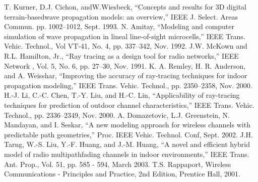 \documentclass[dvipdfmx]{jsarticle}
\begin{document}
\renewcommand{\refname}{文献一覧}
\begin{thebibliography}{99}
T. Kurner, D.J. Cichon, andW.Wiesbeck, “Concepts and results for 3D digital terrain-basedwave propagation models: an overview,” IEEE J. Select. Areas Commun. pp. 1002–1012, Sept. 1993.
N. Amitay, “Modeling and computer simulation of wave propagation in lineal line-of-sight microcells,” IEEE
Trans. Vehic. Technol., Vol VT-41, No. 4, pp. 337–342, Nov. 1992.
J.W. McKown and R.L. Hamilton, Jr., “Ray tracing as a design tool for radio networks,” IEEE Network , Vol.
5, No. 6, pp. 27–30, Nov. 1991.
K. A. Remley, H. R. Anderson, and A. Weisshar, “Improving the accuracy of ray-tracing techniques for
indoor propagation modeling,” IEEE Trans. Vehic. Technol., pp. 2350–2358, Nov. 2000.
H.-J. Li, C.-C. Chen, T.-Y. Liu, and H.-C. Lin, “Applicability of ray-tracing techniques for prediction of
outdoor channel characteristics,” IEEE Trans. Vehic. Technol., pp. 2336–2349, Nov. 2000.
A. Domazetovic, L.J. Greenstein, N. Mandayan, and I. Seskar, “A new modeling approach for wireless channels
with predictable path geometries,” Proc. IEEE Vehic. Technol. Conf, Sept. 2002.
J.H. Tarng, W.-S. Liu, Y.-F. Huang, and J.-M. Huang, “A novel and efficient hybrid model of radio multipathfading
channels in indoor environments,” IEEE Trans. Ant. Prop., Vol. 51, pp. 585 - 594, March 2003.
T.S. Rappaport, Wireless Communications - Principles and Practice, 2nd Edition, Prentice Hall, 2001.
\end{thebibliography}
\end{document}
